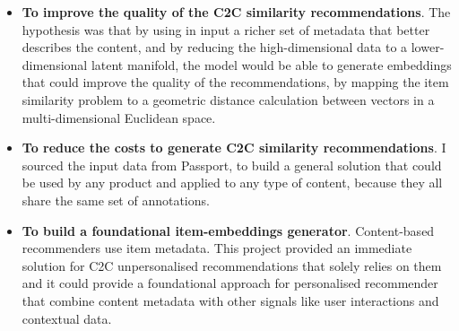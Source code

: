 \begin{itemize}
  \item \textbf{To improve the quality of the C2C similarity recommendations}. The hypothesis was that by using in input a richer set of metadata that
  better describes the content, and by reducing the high-dimensional data to a lower-dimensional latent manifold,
  the model would be able to generate embeddings that could improve the quality of the recommendations, by mapping the
  item similarity problem to a geometric distance calculation between vectors in a multi-dimensional Euclidean space.
  \item \textbf{To reduce the costs to generate C2C similarity recommendations}. I sourced the input
  data from Passport, to build a general solution that could be used by any product and applied to any type of content,
  because they all share the same set of annotations.
  \item \textbf{To build a foundational item-embeddings generator}. Content-based recommenders
  use item metadata. This project provided an immediate solution for C2C unpersonalised recommendations that solely relies on them and
  it could provide a foundational approach for personalised recommender that combine content metadata with other signals like user interactions
  and contextual data.
\end{itemize}

